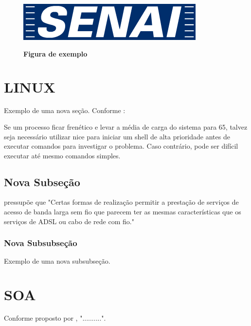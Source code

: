 \documentclass[
	12pt,				%
	openright,			%
	oneside,			%
	a4paper,			%
	chapter=TITLE,		%
	section=TITLE,		%
	english,			%
	french,				%
	spanish,			%
	brazil				%
	]{abntex2}
\begin{document}
\begin{figure}[htb]
  \begin{center}
    \caption{\textbf{Figura de exemplo}}
    \label{fig-exemplo}
    \includegraphics [scale=0.6]{logo-senai.jpg}
    \label{fig-exemplo}
  \end{center}
\end{figure}



\section{LINUX}

Exemplo de uma nova seção.
Conforme :

\begin{citacao}
Se um processo ficar frenético e levar a média de carga do sistema para 65, talvez seja necessário utilizar nice para iniciar um shell de alta prioridade antes de executar comandos para investigar o problema. Caso contrário, pode ser difícil executar até mesmo comandos simples.\cite[p.44]{nemeth2004manual}
\end{citacao}

\subsection{Nova Subseção}

 pressupõe que "Certas formas de realização permitir a prestação de serviços de acesso de banda larga sem fio que parecem ter as mesmas características que os serviços de ADSL ou cabo de rede com fio."

\subsubsection{Nova Subsubseção}

Exemplo de uma nova subsubseção.

\section{SOA}

Conforme proposto por , "..........".
\end{document}
